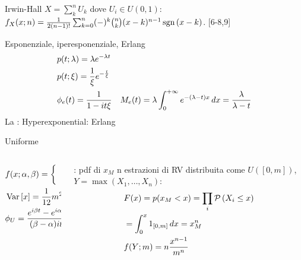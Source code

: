 \begin{frame}{Irwin-Hall}
$X=\sum_k^nU_k$ dove $U_i\in U(0,1)$: $f_X(x;n)=\frac{1}{2(n-1)!}\sum_{k=0}^n(-)^k\binom{n}{k}(x-k)^{n-1}\operatorname{sgn}{(x-k)}$.
[6-8,9]
    
\end{frame}

\begin{frame}{Esponenziale, iperesponenziale, Erlang}
\begin{align*}
&p(t;\lambda)=\lambda e^{-\lambda t}\\
&p(t;\xi)=\frac{1}{\xi}e^{-\frac{t}{\xi}}\\
&\phi_e(t)=\frac{1}{1-it\xi}
&M_e(t)=\lambda\int_{0}^{+\infty}{}e^{-(\lambda-t)x}\,dx=\frac{\lambda}{\lambda-t}
\end{align*}
La : 
Hyperexponential:
Erlang
\end{frame}

\begin{frame}{Uniforme}
\begin{columns}[T]
	\begin{column}{0.5\textwidth}
	\begin{align*}
	&f(x;\alpha,\beta)=\left\{\begin{array}{c}\frac{1}{\beta-\alpha}\\0\\
	\end{array}\right.\\
	&\operatorname{Var}{[x]}=\frac{1}{12}m^2\\
	&\phi_U=\frac{e^{i\beta t}-e^{i\alpha t}}{(\beta-\alpha)it}
	\end{align*}
	\end{column}
	\begin{column}{0.5\textwidth}
	\begin{block}{: pdf di $x_M$}
		n estrazioni di RV distribuita come $U([0,m])$, $Y=\max{(X_1,\ldots,X_n)}$:
		\begin{align*}
		&F(x)=p(x_M<x)=\prod_i\operatorname{\mathcal{P}}{(X_i\leq x)}\\
		&=\int_0^x1_{[0,m]}\,dx=x_M^n\\
		&f(Y;m)=n\frac{x^{n-1}}{m^n}
		\end{align*}
	\end{block}
\end{column}
\end{columns}
\end{frame}

